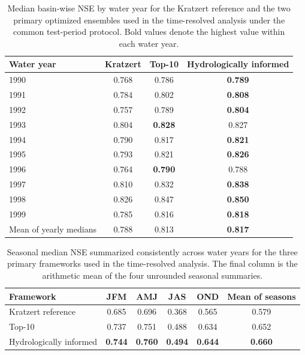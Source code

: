 \begin{table}[htbp]
\centering
\caption{Median basin-wise NSE by water year for the Kratzert \citep{Kratzert_2024} reference and the two primary optimized ensembles used in the time-resolved analysis under the common test-period protocol. Bold values denote the highest value within each water year.}
\label{tab:wy_nse_by_year}
\small
\renewcommand{\arraystretch}{1.12}
\begin{tabular}{lccc}
\toprule
Water year & Kratzert & Top-10 & Hydrologically informed \\
\midrule
1990 & 0.768 & 0.786 & \textbf{0.789} \\
1991 & 0.784 & 0.802 & \textbf{0.808} \\
1992 & 0.757 & 0.789 & \textbf{0.804} \\
1993 & 0.804 & \textbf{0.828} & 0.827 \\
1994 & 0.790 & 0.817 & \textbf{0.821} \\
1995 & 0.793 & 0.821 & \textbf{0.826} \\
1996 & 0.764 & \textbf{0.790} & 0.788 \\
1997 & 0.810 & 0.832 & \textbf{0.838} \\
1998 & 0.826 & 0.847 & \textbf{0.850} \\
1999 & 0.785 & 0.816 & \textbf{0.818} \\
\midrule
Mean of yearly medians & 0.788 & 0.813 & \textbf{0.817} \\
\bottomrule
\end{tabular}
\end{table}

\begin{table}[htbp]
\centering
\caption{Seasonal median NSE summarized consistently across water years for the three primary frameworks used in the time-resolved analysis. The final column is the arithmetic mean of the four unrounded seasonal summaries.}
\label{tab:seasonal_nse_frameworks}
\small
\renewcommand{\arraystretch}{1.15}
\begin{tabular}{lccccc}
\toprule
Framework & JFM & AMJ & JAS & OND & Mean of seasons \\
\midrule
Kratzert reference & 0.685 & 0.696 & 0.368 & 0.565 & 0.579 \\
Top-10 & 0.737 & 0.751 & 0.488 & 0.634 & 0.652 \\
Hydrologically informed & \textbf{0.744} & \textbf{0.760} & \textbf{0.494} & \textbf{0.644} & \textbf{0.660} \\
\bottomrule
\end{tabular}
\end{table}

